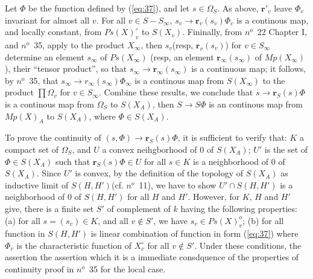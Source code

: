 \documentclass[12pt]{amsart}
\def\br{{\mathbf{r}}}
\begin{document}
Let $\Phi$ be the function defined by (\ref{eq:37}), and let $s\in \Omega_S$. 
As above, $\br'_v$ leave $\Phi_v$ invariant for almost all $v$. 
For all $v\in S-S_\infty$, $s_v\to \br_v(s_v)\Phi_v$ is a continous map, 
and locally constant, from $Ps(X)_v^\circ$ to $S(X_v)$. 
Fininally, from $n^o$~22 Chapter I, and $n^o$~35, 
apply to the product $X_\infty$, then $s_v$(resp, $\br_v(s_v)$) 
for $v\in S_\infty$ determine an element $s_\infty$ of $Ps(X_\infty)$
(resp, an element $\br_\infty(s_\infty)$ of $Mp(X_\infty)$),
 their ``tensor product'', so that $s_\infty \to \br_\infty(s_\infty)$ is a 
continuous map; it follows, by $n^o$~35, 
that $s_\infty \to r_\infty(s_\infty)\Phi_\infty$ is a continous map from $S(X_\infty)$
to the product $\prod \Omega_v$ for $v\in S_\infty$. 
Combine these results, we conclude that $s\to \br_S(s)\Phi$ is a continous map 
from $\Omega_S$ to $S(X_A)$, then $S\to S\Phi$ is an continous map from
$Mp(X)_A$ to $S(X_A)$, where $\Phi \in S(X_A)$.
	
To prove the continuity of $(s, \Phi)\to \br_S(s)\Phi$, it is sufficient 
to verify  that: $K$ a compact set of $\Omega_S$, and $U$ 
a convex neihgborhood of $0$ of $S(X_A)$; $U'$ is the set 
of $\Phi\in S(X_A)$ such that $\br_S(s)\Phi\in U$ for all $s\in K$ is a
 neighborhood of $0$ of $S(X_A)$. Since $U'$ is convex, 
by the definition of the topology of $S(X_A)$ as inductive limit of 
$S(H,H')$(cf. $n^o$~11), we have to show $U'\cap S(H,H')$ is a neighborhood of 
$0$ of $S(H,H')$ for all $H$ and $H'$. 
However, for $K$, $H$ and $H'$ give, there is a finite set $S'$ of complement 
of $k$ having the following properties: (a) for all $s=(s_v)\in K$, and all 
$v\notin S'$, we have $s_v\in Ps(X)_v^o$; (b) for all function in $S(H,H')$
is linear combination of function in form (\ref{eq:37}) where $\Phi_v$ 
is the characteristic function of $X_v^\circ$ for all $v\notin S'$. 
Under these conditions, the assertion the assertion which it is a
immediate consdquence of the properties of continuity proof in $n^o$~35 
for the local case.

\def\barx{{\bar{x}}}
\def\dotx{{\dot{x}}}
\end{document}
